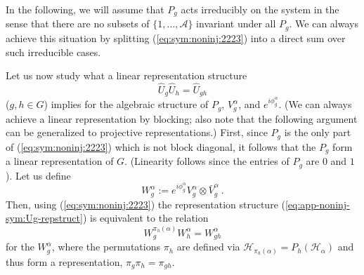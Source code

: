 \documentclass[twocolumn,superscriptaddress,prb,linenumbers]{revtex4-1}
\newcommand{\mc}[1]{\mathcal{#1}}
\begin{document}
In the following, we will assume that $P_g$ acts irreducibly on the system
in the sense that there are no subsets of $\{1,\dots,\mc A\}$ invariant
under all $P_g$.  We can always achieve this situation by splitting
(\ref{eq:sym:noninj:2223})
into a direct sum over such irreducible cases.

Let us now study what a linear representation structure
\begin{equation}
    \label{eq:app-noninj-sym:Ug-repstruct}
    \hat U_g\hat U_h = \hat U_{gh}
\end{equation}
($g,h\in G$) implies for the algebraic structure of $P_g$, $V_g^\alpha$,
and $e^{i\phi_g^\alpha}$. (We can always achieve a linear representation
by blocking; also note that the following argument can be generalized to
projective representations.) First, since $P_g$ is the only part of
(\ref{eq:sym:noninj:2223}) which is not block diagonal, it follows that
the $P_g$ form a linear representation of $G$. (Linearity follows since
the entries of $P_g$ are $0$ and $1$). Let us define
\begin{equation}
    \label{eq:app-noninj-sym:def-W}
    W^\alpha_g:= e^{i\phi^\alpha_g} V_g^\alpha\otimes \bar V_g^\alpha\ .
\end{equation}
Then, using (\ref{eq:sym:noninj:2223}) the representation
structure (\ref{eq:app-noninj-sym:Ug-repstruct}) is equivalent to the
relation
\begin{equation}
    \label{eq:app-noninj-sum:Wg-structure}
    W^{\pi_h(\alpha)}_g W^\alpha_h =W^\alpha_{gh}
\end{equation}
for the $W^{\alpha}_g$, where the permutations $\pi_h$ are defined via
$\mc H_{\pi_h(\alpha)}=P_h(\mc H_{\alpha})$ and thus form a representation,
$\pi_g\pi_h = \pi_{gh}$.
\end{document}
